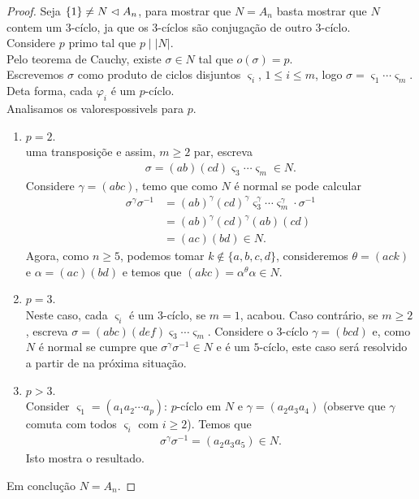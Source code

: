 \begin{proof} 
  Seja $\{1\}\neq N\vartriangleleft A_n$, para mostrar que $N=A_n$ basta mostrar que $N$ contem um $3$-cíclo, ja que os $3$-cíclos são conjugação de outro $3$-cíclo.\\
  Considere $p$ primo tal que $p\mid |N|$.\\
  Pelo teorema de Cauchy, existe $\sigma\in N$ tal que $o(\sigma)=p$.\\
  Escrevemos $\sigma$ como produto de ciclos disjuntos $\varsigma_i$, $1\leq i\leq m$, logo $\sigma=\varsigma_1\cdots\varsigma_m$.\\
  Deta forma, cada $\varphi_i$ é um $p$-cíclo.\\
  Analisamos os valorespossivels para $p$.
  \begin{enumerate}
    \item $p=2$.\\
      uma transposiçõe e assim, $m\geq 2$ par, escreva
      \begin{align*}
        \sigma=(ab)(cd)\varsigma_3\cdots\varsigma_m\in N.
      \end{align*}
      Considere $\gamma=(abc)$, temo que como $N$ é normal se pode calcular
      \begin{align*}
        \sigma^{\gamma}\sigma^{-1}&=(ab)^{\gamma}(cd)^{\gamma}\varsigma_3^{\gamma}\cdots\varsigma_{m}^{\gamma}\cdot \sigma^{-1}\\
        &=(ab)^{\gamma}(cd)^{\gamma}(ab)(cd)\\
        &=(ac)(bd)\in N.
      \end{align*}
      Agora, como $n\geq 5$, podemos tomar $k\notin\{a,b,c,d\}$, consideremos $\theta=(ack)$ e $\alpha=(ac)(bd)$ e temos que $(akc)=\alpha^{\theta}\alpha\in N$.
    \item $p=3$.\\
      Neste caso, cada $\varsigma_i$ é um $3$-cíclo, se $m=1$, acabou. Caso contrário, se $m\geq 2$, escreva $\sigma=(abc)(def)\varsigma_3\cdots\varsigma_m$. Considere o $3$-cíclo $\gamma=(bcd)$ e, como $N$ é normal se cumpre que $\sigma^{\gamma}\sigma^{-1}\in N$ e é um $5$-cíclo, este caso será resolvido a partir de na próxima situação.
    \item $p>3$.\\
      Consider $\varsigma_1=(a_1a_2\cdots a_p)$: $p$-cíclo em $N$ e $\gamma=(a_2a_3a_4)$ (observe que $\gamma$ comuta com todos $\varsigma_i$ com $i\geq 2$). Temos que
      \begin{align*}
        \sigma^{\gamma}\sigma^{-1}=(a_2a_3a_5)\in N.
      \end{align*}
      Isto mostra o resultado.
  \end{enumerate}
  Em conclução $N=A_n$.
\end{proof}
